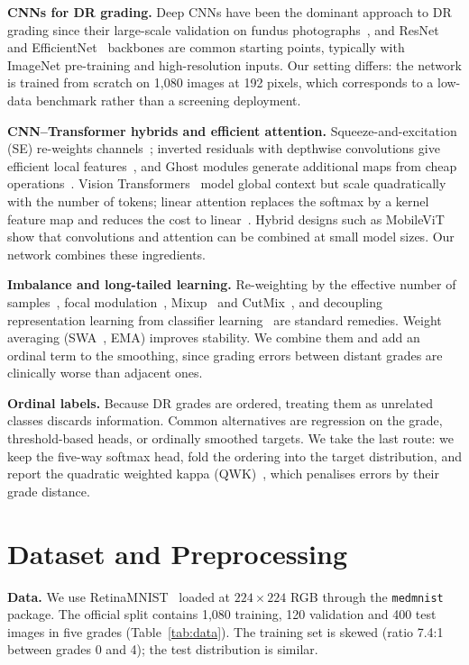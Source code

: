 \documentclass[10pt,twocolumn]{article}
\begin{document}
\textbf{CNNs for DR grading.} Deep CNNs have been the dominant approach to DR grading since their large-scale validation on fundus photographs~\cite{gulshan}, and ResNet~\cite{resnet} and EfficientNet~\cite{efficientnet} backbones are common starting points, typically with ImageNet pre-training and high-resolution inputs. Our setting differs: the network is trained from scratch on 1,080 images at 192 pixels, which corresponds to a low-data benchmark rather than a screening deployment.

\textbf{CNN--Transformer hybrids and efficient attention.} Squeeze-and-excitation (SE) re-weights channels~\cite{senet}; inverted residuals with depthwise convolutions give efficient local features~\cite{mobilenetv2}, and Ghost modules generate additional maps from cheap operations~\cite{ghostnet}. Vision Transformers~\cite{vit} model global context but scale quadratically with the number of tokens; linear attention replaces the softmax by a kernel feature map and reduces the cost to linear~\cite{linattn}. Hybrid designs such as MobileViT~\cite{mobilevit} show that convolutions and attention can be combined at small model sizes. Our network combines these ingredients.

\textbf{Imbalance and long-tailed learning.} Re-weighting by the effective number of samples~\cite{cbloss}, focal modulation~\cite{focal}, Mixup~\cite{mixup} and CutMix~\cite{cutmix}, and decoupling representation learning from classifier learning~\cite{decouple} are standard remedies. Weight averaging (SWA~\cite{swa}, EMA) improves stability. We combine them and add an ordinal term to the smoothing, since grading errors between distant grades are clinically worse than adjacent ones.

\textbf{Ordinal labels.} Because DR grades are ordered, treating them as unrelated classes discards information. Common alternatives are regression on the grade, threshold-based heads, or ordinally smoothed targets. We take the last route: we keep the five-way softmax head, fold the ordering into the target distribution, and report the quadratic weighted kappa (QWK)~\cite{cohen}, which penalises errors by their grade distance.

\section{Dataset and Preprocessing}\label{sec:data}
\textbf{Data.} We use RetinaMNIST~\cite{medmnistv2} loaded at $224{\times}224$ RGB through the \texttt{medmnist} package. The official split contains 1,080 training, 120 validation and 400 test images in five grades (Table~\ref{tab:data}). The training set is skewed (ratio 7.4:1 between grades 0 and 4); the test distribution is similar.
\end{document}
